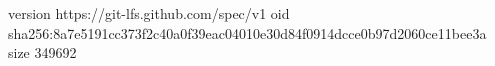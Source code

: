 version https://git-lfs.github.com/spec/v1
oid sha256:8a7e5191cc373f2c40a0f39eac04010e30d84f0914dcce0b97d2060ce11bee3a
size 349692
